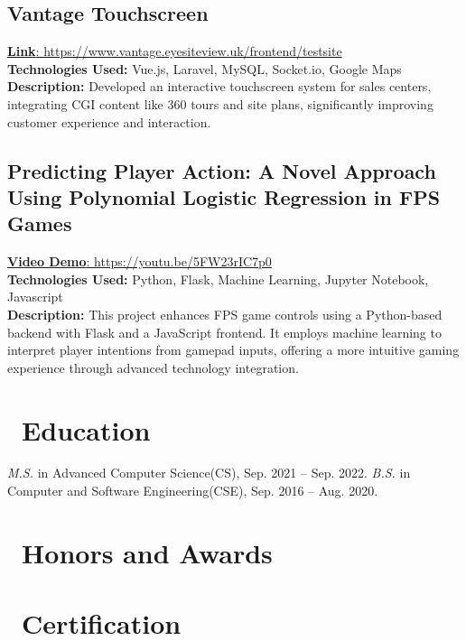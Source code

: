 \documentclass{resume}
\begin{document}
\subsection*{\textbf{Vantage Touchscreen}}
\href{https://www.vantage.eyesiteview.uk/frontend/testsite}{\textbf{Link}: https://www.vantage.eyesiteview.uk/frontend/testsite}  \\
\textbf{Technologies Used:} Vue.js, Laravel, MySQL, Socket.io, Google Maps \\
\textbf{Description:} Developed an interactive touchscreen system for sales centers, integrating CGI content like 360 tours and site plans, significantly improving customer experience and interaction.

\subsection*{\textbf{Predicting Player Action: A Novel Approach Using Polynomial Logistic Regression in FPS Games}}
\href{https://youtu.be/5FW23rIC7p0}{\textbf{Video Demo}: https://youtu.be/5FW23rIC7p0}  \\
\textbf{Technologies Used:} Python, Flask, Machine Learning, Jupyter Notebook, Javascript \\
\textbf{Description:} This project enhances FPS game controls using a Python-based backend with Flask and a JavaScript frontend. It employs machine learning to interpret player intentions from gamepad inputs, offering a more intuitive gaming experience through advanced technology integration. \\
\section{\faGraduationCap\ Education}
\textit{M.S.} in Advanced Computer Science(CS), Sep. 2021 -- Sep. 2022.
\textit{B.S.} in Computer and Software Engineering(CSE), Sep. 2016 -- Aug. 2020.

\section{\faHeartO\ Honors and Awards}

\section{\faCertificate\ Certification}
\end{document}
